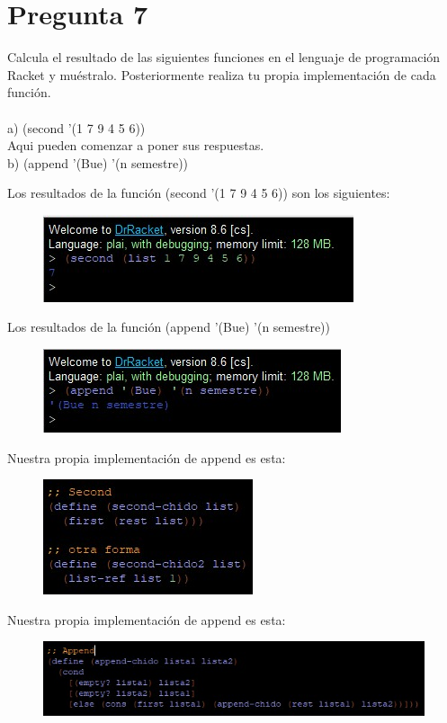 \newpage
\section*{Pregunta 7}
\Large 
Calcula el resultado de las siguientes funciones en el lenguaje de programación Racket y muéstralo. Posteriormente realiza tu propia implementación de cada función.\\\\
a) (second '(1 7 9 4 5 6))\\
\newline
\large
Aqui pueden comenzar a poner sus respuestas.\\
\newline
\Large
b) (append ’(Bue) ’(n semestre))\\
\newline
\large

Los resultados de la función (second '(1 7 9 4 5 6)) son los siguientes:
\begin{figure}[H]
    \centering
    \includegraphics{ResultadoSecond.jpg}
\end{figure}

Los resultados de la función (append '(Bue) '(n semestre))
\begin{figure}[H]
    \centering
    \includegraphics{ResultadoAppend.jpg}
\end{figure}

Nuestra propia implementación de append es esta:
\begin{figure}[H]
    \centering
    \includegraphics{SecondNuestro.jpg}
\end{figure}


Nuestra propia implementación de append es esta:
\begin{figure}[H]
    \centering
    \includegraphics{AppendNuestro.jpg}
\end{figure}
